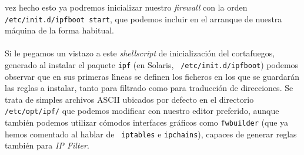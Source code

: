 vez hecho esto ya podremos inicializar nuestro {\it firewall} con la orden 
{\tt /etc/init.d/ipfboot start}, que podemos incluir en el arranque de nuestra
m\'aquina de la forma habitual.\\
\\Si le pegamos un vistazo a este {\it shellscript} de inicializaci\'on del 
cortafuegos, generado al instalar el paquete {\tt ipf} (en Solaris, {\tt 
/etc/init.d/ipfboot}) podemos observar que en sus primeras l\'{\i}neas se 
definen los ficheros en los que se guardar\'an las reglas a instalar, tanto 
para filtrado como para traducci\'on de direcciones. Se trata de simples 
archivos ASCII ubicados por defecto en el directorio {\tt /etc/opt/ipf/} que 
podemos modificar con 
nuestro editor preferido, aunque tambi\'en podemos utilizar c\'omodos interfaces
gr\'aficos como {\tt fwbuilder} (que ya hemos comentado al hablar de {\tt 
iptables} e {\tt ipchains}), capaces de generar reglas tambi\'en para {\it IP 
Filter}.

